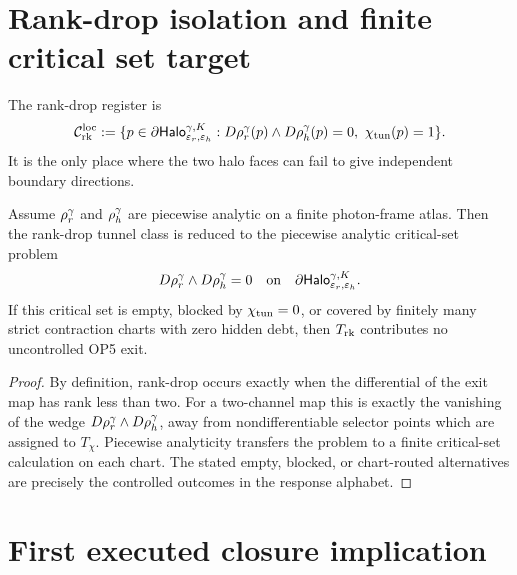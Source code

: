\section{Rank-drop isolation and finite critical set target}

\begin{definition}
The rank-drop register is
\[
\mathcal C_{\mathrm{rk}}^{\mathrm{loc}}
:=
\{p\in\partial\mathsf{Halo}_{\varepsilon_r,\varepsilon_h}^{\gamma,K}:
D\rho_{r}^{\gamma}(p)\wedge D\rho_{h}^{\gamma}(p)=0,
\ \chi_{\mathrm{tun}}(p)=1\}.
\]
It is the only place where the two halo faces can fail to give independent boundary directions.
\end{definition}

\begin{proposition}
Assume \(\rho_{r}^{\gamma}\) and \(\rho_{h}^{\gamma}\) are piecewise analytic on a finite photon-frame atlas. Then the rank-drop tunnel class is reduced to the piecewise analytic critical-set problem
\[
D\rho_{r}^{\gamma}\wedge D\rho_{h}^{\gamma}=0
\quad\text{on}\quad
\partial\mathsf{Halo}_{\varepsilon_r,\varepsilon_h}^{\gamma,K}.
\]
If this critical set is empty, blocked by \(\chi_{\mathrm{tun}}=0\), or covered by finitely many strict contraction charts with zero hidden debt, then \(T_{\mathrm{rk}}\) contributes no uncontrolled OP5 exit.
\end{proposition}

\begin{proof}
By definition, rank-drop occurs exactly when the differential of the exit map has rank less than two. For a two-channel map this is exactly the vanishing of the wedge \(D\rho_{r}^{\gamma}\wedge D\rho_{h}^{\gamma}\), away from nondifferentiable selector points which are assigned to \(T_{\chi}\). Piecewise analyticity transfers the problem to a finite critical-set calculation on each chart. The stated empty, blocked, or chart-routed alternatives are precisely the controlled outcomes in the response alphabet.
\end{proof}

\section{First executed closure implication}

